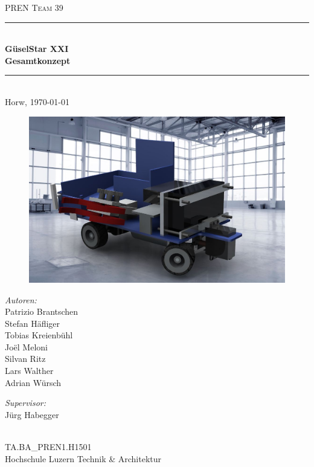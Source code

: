 \begin{titlepage}   

\begin{center}
\textsc{\Large PREN Team 39}\\[0.5cm]

\newcommand{\HRule}{\rule{\linewidth}{0.5mm}}
\HRule \\[0.4cm]
{ \huge \bfseries GüselStar XXI}\\[0.4cm]
{ \LARGE \bfseries Gesamtkonzept}\\[0.4cm]
\HRule \\[1.5cm]

{\large Horw, \today}

\begin{figure}[H]%
\centering
\includegraphics[width=1\textwidth]{03_Loesungskonzept/pictures/Tietelbild1.JPG}
\label{fig:activityRoute}
\end{figure}
\begin{minipage}{0.4\textwidth}
\begin{flushleft} \large
\emph{Autoren:}\\
Patrizio Brantschen\\
Stefan Häfliger\\
Tobias Kreienbühl\\
Joël Meloni\\
Silvan Ritz\\
Lars Walther\\
Adrian Würsch
\end{flushleft}
\end{minipage}
\hfill
\begin{minipage}{0.4\textwidth}
\begin{flushright} \large
\emph{Supervisor:} \\
Jürg Habegger
\end{flushright}
\end{minipage}

\\[0.4cm]
\large
\vfill
TA.BA\_PREN1.H1501 \\
Hochschule Luzern Technik \& Architektur

\end{center}

\end{titlepage}